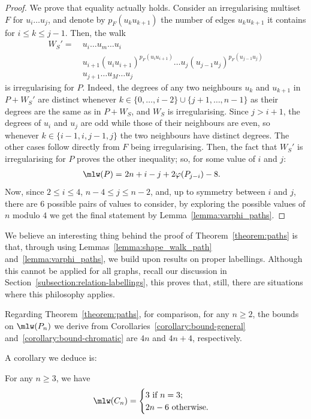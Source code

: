 \documentclass[a4paper,11pt,dvipsnames]{elsarticle}
\begin{document}
\begin{proof}
We prove that equality actually holds. Consider an irregularising multiset $F$ for $u_i\dots u_j$, and denote by $p_F(u_ku_{k+1})$
the number of edges $u_ku_{k+1}$ it contains for $i\le k\le j-1$. Then, the walk
\begin{align*}
    W_S'=~&u_i\dots u_m\dots u_i\\
    &u_{i+1}(u_iu_{i+1})^{p_F(u_iu_{i+1})}\dots u_{j}(u_{j-1}u_j)^{p_F(u_{j-1}u_j)}\\
    &u_{j+1}\dots u_M\dots u_j
\end{align*}
is irregularising for $P$. Indeed, the degrees of any two neighbours $u_k$ and $u_{k+1}$
in $P+W_S'$ are distinct whenever $k\in\{0,\dots,i-2\}\cup\{j+1,\dots,n-1\}$ as their
degrees are the same as in $P+W_S$, and $W_S$ is irregularising.
Since $j>i+1$, the degrees of $u_i$ and $u_j$ are odd while those of their neighbours are even,
so whenever $k\in\{i-1,i,j-1,j\}$ the two neighbours have distinct degrees. The other cases follow directly
from $F$ being irregularising. Then, the fact that $W_S'$ is irregularising for $P$ proves the other
inequality; so, for some value of $i$ and $j$:
\begin{align*}
    \mlw(P)=&~2n+i-j+2\varphi(P_{j-i})-8.
\end{align*}
Now, since $2\le i\le 4$, $n-4\le j\le n-2$, and, up to symmetry between $i$ and $j$, there are $6$ possible pairs of values to consider, by
exploring the possible values of $n$ modulo $4$ we get the final statement by Lemma~\ref{lemma:varphi_paths}.
\end{proof}

We believe an interesting thing behind the proof of Theorem~\ref{theorem:paths} is that, through using Lemmas~\ref{lemma:shape_walk_path} and~\ref{lemma:varphi_paths}, we build upon results on proper labellings. Although this cannot be applied for all graphs, recall our discussion in Section~\ref{subsection:relation-labellings}, this proves that, still, there are situations where this philosophy applies.

Regarding Theorem~\ref{theorem:paths}, for comparison, for any $n \geq 2$, the bounds on $\mlw(P_n)$ we derive from Corollaries~\ref{corollary:bound-general} and~\ref{corollary:bound-chromatic} are $4n$ and $4n+4$, respectively. 

A corollary we deduce is:

\begin{corollary}\label{corollary:cycles}
For any $n \geq 3$, we have
  \[
    \mlw(C_n)=
    \begin{cases}
      3\text{ if }n=3;\\
      2n-6\text{ otherwise.}
    \end{cases}
  \]
\end{corollary}
\end{document}
